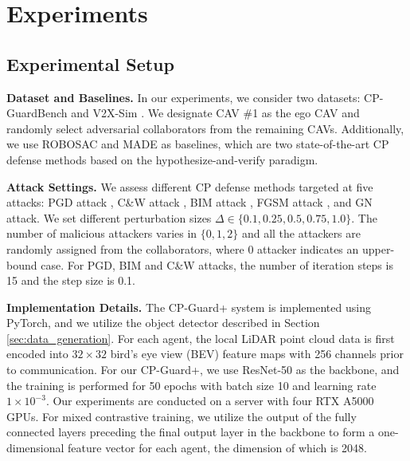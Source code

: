 
\vspace{-3mm}
 
\section{Experiments}

\subsection{Experimental Setup}

\textbf{Dataset and Baselines.} In our experiments, we consider two datasets: CP-GuardBench and V2X-Sim \citep{liV2XSimMultiAgentCollaborative2022}. 
We designate CAV \#1 as the ego CAV and randomly select adversarial collaborators from the remaining CAVs. Additionally, we use ROBOSAC \citep{liUsAdversariallyRobust2023} and MADE \citep{zhaoMaliciousAgentDetection2024} as baselines, which are two state-of-the-art CP defense methods based on the hypothesize-and-verify paradigm.

\textbf{Attack Settings.} We assess different CP defense methods targeted at five attacks: PGD attack \citep{madry2018towards}, C\&W attack \citep{carlini2017evaluatingrobustnessneuralnetworks}, BIM attack \citep{kurakin2017adversarialexamplesphysicalworld}, FGSM attack \citep{goodfellow2015explainingharnessingadversarialexamples}, and GN attack. We set different perturbation sizes $\Delta \in \{0.1, 0.25, 0.5, 0.75, 1.0\}$. The number of malicious attackers varies in $\{0,1,2\}$ and all the attackers are randomly assigned from the collaborators, where 0 attacker indicates an upper-bound case. For PGD, BIM and C\&W attacks, the number of iteration steps is 15 and the step size is 0.1. 

\textbf{Implementation Details.} The CP-Guard+ system is implemented using PyTorch, and we utilize the object detector described in Section \ref{sec:data_generation}.
For each agent, the local LiDAR point cloud data is first encoded into $32\times 32$ bird's eye view (BEV) feature maps with 256 channels prior to communication. For our CP-Guard+, we use ResNet-50 \citep{heDeepResidualLearning2016} as the backbone, and the training is performed for 50 epochs with batch size 10 and learning rate $1\times 10^{-3}$.  Our experiments are conducted on a server with four RTX A5000 GPUs.
For mixed contrastive training, we utilize the output of the fully connected layers preceding the final output layer in the backbone to form a one-dimensional feature vector for each agent, the dimension of which is 2048.

